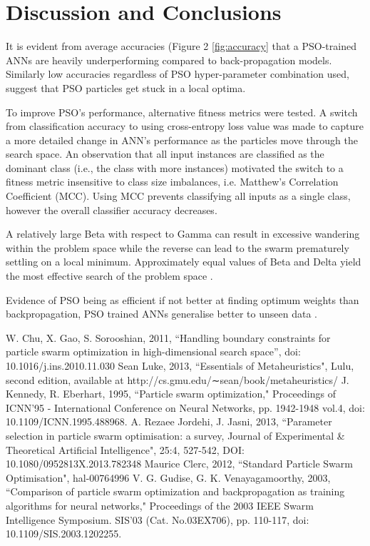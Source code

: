 \documentclass[12pt]{article}
\begin{document}
\vspace{-1.5em}
\section{Discussion and Conclusions}
\vspace{-1.5em}




It is evident from average accuracies (Figure 2 \ref{fig:accuracy} that a PSO-trained ANNs are heavily underperforming compared to back-propagation models. Similarly low accuracies regardless of PSO hyper-parameter combination used, suggest that PSO particles get stuck in a local optima. 

To improve PSO's performance, alternative fitness metrics were tested. A switch from classification accuracy to using cross-entropy loss value was made to capture a more detailed change in ANN's performance as the particles move through the search space.  An observation that all input instances are classified as the dominant class (i.e., the class with more instances) motivated the switch to a fitness metric insensitive to class size  imbalances, i.e. Matthew's Correlation Coefficient (MCC). Using MCC prevents classifying all inputs as a single class, however the overall classifier accuracy decreases. 



A relatively large Beta with respect to Gamma can result in excessive wandering within the problem space while the reverse  can lead to the swarm prematurely settling on a local minimum. Approximately equal values of Beta and Delta yield the most effective search of the problem space \cite{Kennedy}.

Evidence of PSO being as efficient if not better at finding optimum weights than backpropagation, PSO trained ANNs generalise better to unseen data \cite{Kennedy}.


\vspace{-1.5em}
\begin{thebibliography}{10}

 W. Chu, X. Gao, S. Sorooshian, 2011, ``Handling boundary constraints for particle swarm optimization in high-dimensional search space'', doi: 10.1016/j.ins.2010.11.030
 Sean Luke, 2013, ``Essentials of Metaheuristics", Lulu, second edition, available at http://cs.gmu.edu/∼sean/book/metaheuristics/
 J. Kennedy, R. Eberhart, 1995, ``Particle swarm optimization," Proceedings of ICNN'95 - International Conference on Neural Networks,  pp. 1942-1948 vol.4, doi: 10.1109/ICNN.1995.488968.
 A. Rezaee Jordehi, J. Jasni, 2013, ``Parameter selection in particle swarm optimisation: a survey, Journal of Experimental \& Theoretical Artificial Intelligence", 25:4, 527-542, DOI: 10.1080/0952813X.2013.782348
 Maurice Clerc, 2012, ``Standard Particle Swarm Optimisation", hal-00764996
  V. G. Gudise, G. K. Venayagamoorthy, 2003, ``Comparison of particle swarm optimization and backpropagation as training algorithms for neural networks," Proceedings of the 2003 IEEE Swarm Intelligence Symposium. SIS'03 (Cat. No.03EX706), pp. 110-117, doi: 10.1109/SIS.2003.1202255.


\end{thebibliography}
\end{document}
